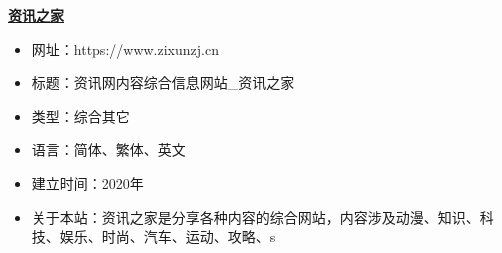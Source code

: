 \textbf{\href{https://www.zixunzj.cn}{资讯之家}}
\begin{itemize}
\item 网址：https://www.zixunzj.cn
\item 标题：资讯网内容综合信息网站_资讯之家
\item 类型：综合其它
\item 语言：简体、繁体、英文
\item 建立时间：2020年
\item 关于本站：资讯之家是分享各种内容的综合网站，内容涉及动漫、知识、科技、娱乐、时尚、汽车、运动、攻略、s
\end{itemize}


